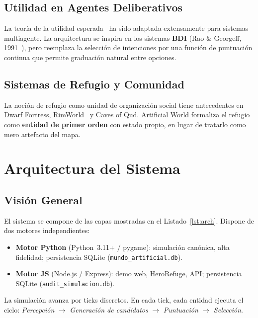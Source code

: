 \documentclass[11pt,a4paper,twocolumn]{article}
\begin{document}
\subsection{Utilidad en Agentes Deliberativos}

La teor\'ia de la utilidad esperada~\cite{VonNeumann1944} ha sido
adaptada extensamente para sistemas multiagente.
La arquitectura se inspira en los sistemas \textbf{BDI}
(Rao \& Georgeff, 1991~\cite{Rao1991}), pero reemplaza la selecci\'on
de intenciones por una funci\'on de puntuaci\'on continua que permite
graduaci\'on natural entre opciones.

\subsection{Sistemas de Refugio y Comunidad}

La noci\'on de refugio como unidad de organizaci\'on social tiene
antecedentes en Dwarf Fortress, RimWorld~\cite{Sylvester2013} y Caves
of Qud. Artificial World formaliza el refugio como \textbf{entidad de
primer orden} con estado propio, en lugar de tratarlo como mero
artefacto del mapa.

\section{Arquitectura del Sistema}

\subsection{Visi\'on General}

El sistema se compone de las capas mostradas en el
Listado~\ref{lst:arch}.
Dispone de dos motores independientes:

\begin{itemize}[leftmargin=1em, itemsep=2pt, topsep=2pt]
  \item \textbf{Motor Python} (Python~3.11+ / pygame): simulaci\'on
        can\'onica, alta fidelidad; persistencia SQLite
        (\texttt{mundo\_artificial.db}).
  \item \textbf{Motor JS} (Node.js / Express): demo web, HeroRefuge,
        API; persistencia SQLite (\texttt{audit\_simulacion.db}).
\end{itemize}

La simulaci\'on avanza por ticks discretos. En cada tick, cada entidad
ejecuta el ciclo: \textit{Percepci\'on} $\to$ \textit{Generaci\'on de
candidatos} $\to$ \textit{Puntuaci\'on} $\to$ \textit{Selecci\'on}.
\end{document}
